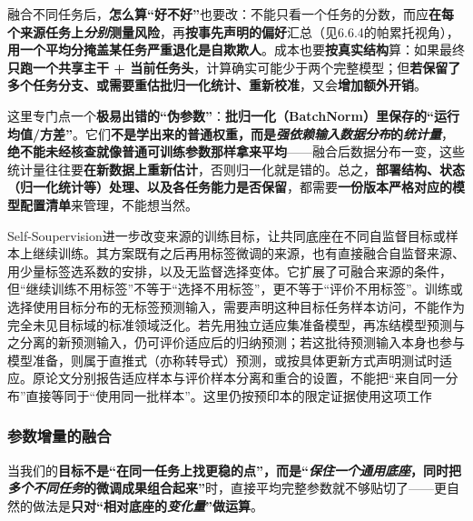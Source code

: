 融合不同任务后，\textbf{怎么算“好不好”}也要改：不能只看一个任务的分数，而应\textbf{在每个来源任务上\emph{分别}测量风险}，再\textbf{按事先声明的偏好}汇总（见6.6.4的帕累托视角），\textbf{用一个平均分掩盖某任务严重退化是自欺欺人}。成本也要\textbf{按真实结构}算：如果最终\textbf{只跑一个共享主干 + 当前任务头}，计算确实可能少于两个完整模型；但\textbf{若保留了多个任务分支、或需要重估批归一化统计、重新校准}，又会\textbf{增加额外开销}。

这里专门点一个\textbf{极易出错的“伪参数”}：\textbf{批归一化（BatchNorm）里保存的“运行均值/方差”}。它们\textbf{不是学出来的普通权重，而是\emph{强依赖输入数据分布}的\emph{统计量}}，\textbf{绝不能未经核查就像普通可训练参数那样拿来平均}——融合后数据分布一变，这些统计量往往要\textbf{在新数据上重新估计}，否则归一化就是错的。总之，\textbf{部署结构、状态（归一化统计等）处理、以及各任务能力是否保留}，都需要\textbf{一份版本严格对应的模型配置清单}来管理，不能想当然。

Self-Soupervision进一步改变来源的训练目标，让共同底座在不同自监督目标或样本上继续训练。其方案既有之后再用标签微调的来源，也有直接融合自监督来源、用少量标签选系数的安排，以及无监督选择变体。它扩展了可融合来源的条件，但“继续训练不用标签”不等于“选择不用标签”，更不等于“评价不用标签”。训练或选择使用目标分布的无标签预测输入，需要声明这种目标任务样本访问，不能作为完全未见目标域的标准领域泛化。若先用独立适应集准备模型，再冻结模型预测与之分离的新预测输入，仍可评价适应后的归纳预测；若这批待预测输入本身也参与模型准备，则属于直推式（亦称转导式）预测，或按具体更新方式声明测试时适应。原论文分别报告适应样本与评价样本分离和重合的设置，不能把“来自同一分布”直接等同于“使用同一批样本”。这里仍按预印本的限定证据使用这项工作

\subsubsection{参数增量的融合}
\label{sec:ket-integration-deltas}

当我们的\textbf{目标不是“在同一任务上找更稳的点”，而是“\emph{保住一个通用底座}，同时把\emph{多个不同任务}的微调成果组合起来”}时，直接平均完整参数就不够贴切了——更自然的做法是\textbf{只对“相对底座的\emph{变化量}”做运算}。

